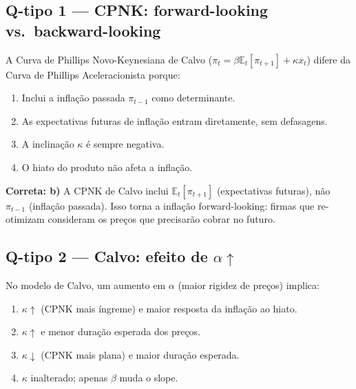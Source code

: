 \documentclass[12pt, a4paper]{article}
\newcommand{\E}{\mathbb{E}}
\begin{document}
\bigskip

\subsection*{Q-tipo 1 --- CPNK: forward-looking vs.\ backward-looking}

A Curva de Phillips Novo-Keynesiana de Calvo ($\pi_t = \beta\E_t[\pi_{t+1}] + \kappa x_t$)
difere da Curva de Phillips Aceleracionista porque:

\begin{enumerate}[label=\textbf{\alph*)}, leftmargin=2em, itemsep=4pt]
  \item Inclui a inflação passada $\pi_{t-1}$ como determinante.
  \item As expectativas futuras de inflação entram diretamente, sem defasagens.
  \item A inclinação $\kappa$ é sempre negativa.
  \item O hiato do produto não afeta a inflação.
\end{enumerate}

\begin{resultbox}[title={Resposta Q-tipo 1: alternativa b)}]
\textbf{Correta: b)} A CPNK de Calvo inclui $\E_t[\pi_{t+1}]$ (expectativas futuras),
não $\pi_{t-1}$ (inflação passada). Isso torna a inflação forward-looking: firmas
que re-otimizam consideram os preços que precisarão cobrar no futuro.
\end{resultbox}

\bigskip

\subsection*{Q-tipo 2 --- Calvo: efeito de $\alpha\uparrow$}

No modelo de Calvo, um aumento em $\alpha$ (maior rigidez de preços) implica:

\begin{enumerate}[label=\textbf{\alph*)}, leftmargin=2em, itemsep=4pt]
  \item $\kappa\uparrow$ (CPNK mais íngreme) e maior resposta da inflação ao hiato.
  \item $\kappa\uparrow$ e menor duração esperada dos preços.
  \item $\kappa\downarrow$ (CPNK mais plana) e maior duração esperada.
  \item $\kappa$ inalterado; apenas $\beta$ muda o slope.
\end{enumerate}
\end{document}
